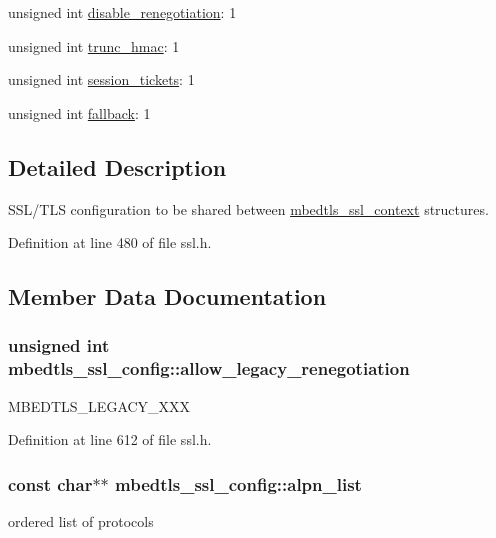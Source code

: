 \begin{DoxyCompactItemize}
\item 
unsigned int \hyperlink{structmbedtls__ssl__config_a953d3f0bbb40ed6f4020dc3e1a196dfb}{disable\-\_\-renegotiation}\-: 1
\item 
unsigned int \hyperlink{structmbedtls__ssl__config_a24bf9d624a2e2432518e9da8ae908db4}{trunc\-\_\-hmac}\-: 1
\item 
unsigned int \hyperlink{structmbedtls__ssl__config_a1b988bcd1b38c51cb802bf8af5d05c7b}{session\-\_\-tickets}\-: 1
\item 
unsigned int \hyperlink{structmbedtls__ssl__config_a0ca184f6088f938d7240157e8b4bbbab}{fallback}\-: 1
\end{DoxyCompactItemize}


\subsection{Detailed Description}
S\-S\-L/\-T\-L\-S configuration to be shared between \hyperlink{structmbedtls__ssl__context}{mbedtls\-\_\-ssl\-\_\-context} structures. 

Definition at line 480 of file ssl.\-h.



\subsection{Member Data Documentation}
\hypertarget{structmbedtls__ssl__config_afcd4e0685b3fca3c49043bdd6a84490f}{
\subsubsection[{allow\-\_\-legacy\-\_\-renegotiation}]{\setlength{\rightskip}{0pt plus 5cm}unsigned int mbedtls\-\_\-ssl\-\_\-config\-::allow\-\_\-legacy\-\_\-renegotiation}}\label{structmbedtls__ssl__config_afcd4e0685b3fca3c49043bdd6a84490f}
M\-B\-E\-D\-T\-L\-S\-\_\-\-L\-E\-G\-A\-C\-Y\-\_\-\-X\-X\-X 

Definition at line 612 of file ssl.\-h.

\hypertarget{structmbedtls__ssl__config_abed0cad3facb6f2b84ca53199ac629ab}{
\subsubsection[{alpn\-\_\-list}]{\setlength{\rightskip}{0pt plus 5cm}const char$\ast$$\ast$ mbedtls\-\_\-ssl\-\_\-config\-::alpn\-\_\-list}}\label{structmbedtls__ssl__config_abed0cad3facb6f2b84ca53199ac629ab}
ordered list of protocols 

